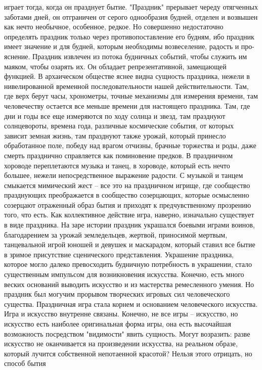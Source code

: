 \documentclass[12pt]{article}
\begin{document}
играет тогда, когда он празднует бытие. "Праздник" прерывает череду отягченных заботами дней, он отграничен
от серого однообразия будней, отделен и возвышен как нечто необычное, особенное, редкое. Но совершенно
недостаточно определять праздник только через противопоставление его будням, ибо праздник имеет значение
и  для  будней,  которым  необходимы  возвеселение,  радость  и  про-яснение.  Праздник  извлечен  из  потока
будничных событий, чтобы служить им маяком, чтобы озарять их. Он обладает репрезентативной, замещающей
функцией. В архаическом обществе яснее видна сущность праздника, нежели в нивелированной временной
последовательности нашей действительности. Там, где верх берут часы, хронометры, точные механизмы для
измерения времени, там человечеству остается все меньше времени для настоящего праздника. Там, где дни и
годы все еще измеряются по ходу солнца и звезд, там празднуют солнцевороты, времена года, различные
космические события, от которых зависит земная жизнь, там празднуют также урожай, который принесло
обработанное  поле,  победу  над  врагом  отчизны,  брачные  торжества  и  роды,  даже  смерть  празднично
справляется как поминовение предков. В праздничном хороводе переплетаются музыка и танец, в хороводе,
который есть нечто большее, нежели непосредственное выражение радости. С музыкой и танцем смыкается
мимический жест -- все это на праздничном игрище, где сообщество празднующих преображается в сообщество
созерцающих,  которые  осмысленно  созерцают  отраженный  образ  бытия  и  приходят  к  предчувственному
прозрению того, что есть. Как коллективное действие игра, наверно, изначально существует в виде праздника.
На заре истории праздник украшался боевыми играми воинов, благодарением за урожай земледельцев, жертвой,
приносимой мертвым, танцевальной игрой юношей и девушек и маскарадом, который ставил все бытие в
зримое присутствие сценического представления. Украшение праздника, которое могло далеко превосходить
будничную потребность в украшении, стало существенным импульсом для возникновения искусства. Конечно,
есть много веских оснований выводить искусство и из мастерства ремесленного умения. Но праздник был
могучим  прорывом  творческих  игровых  сил  человеческого  существа.  Праздничная  игра  стала  корнем  и
основанием человеческого искусства. Игра и искусство внутренне связаны. Конечно, не все игры -- искусство,
но  искусство  есть  наиболее  оригинальная  форма  игры,  она  есть  высочайшая  возможность  посредством
"видимости" явить сущность. Могут возразить: разве искусство не оканчивается на произведении искусства, на
реальном образе, который лучится собственной непотаенной красотой? Нельзя этого отрицать, но способ бытия
\end{document}

